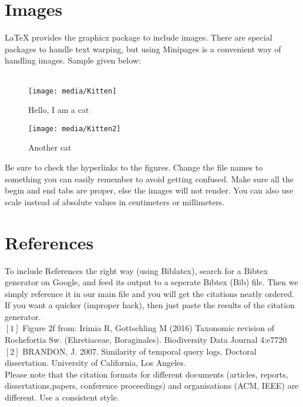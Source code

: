 \documentclass[ 12pt,a4paper,twocolumn,fleqn]{article}
\begin{document}
\section{Images}
\LaTeX{} provides the graphicx package to include images. There are special packages to handle text warping, but using Minipages is a convenient way of handling images. Sample given below: \\
\hfill
\\
\begin{figure}[H]
\begin{minipage}{0.5\textwidth}
\texttt{[image: media/Kitten]}
\centering
\caption{Hello, I am a cat}
\end{minipage}
\begin{minipage}
{.5\textwidth}
\texttt{[image: media/Kitten2]}
\centering
\caption{Another cat}
\end{minipage}
\end{figure}
Be sure to check the hyperlinks to the figures. Change the file names to something you can easily remember to avoid getting confused. Make sure all the begin and end tabs are proper, else the images will not render. You can also use scale instead of absolute values in centimeters or millimeters.
\section{References}

To include References the right way (using Biblatex), search for a Bibtex generator on Google, and feed its output to a seperate Bibtex (Bib) file. Then we simply reference it in our main file and you will get the citations neatly ordered. If you want a quicker (improper hack), then just paste the results of the citation generator. \\
$[1]$ Figure 2f from: Irimia R, Gottschling M (2016) Taxonomic revision of Rochefortia Sw. (Ehretiaceae, Boraginales). Biodiversity Data Journal 4:e7720 
\\
$[2]$ BRANDON, J. 2007. Similarity of temporal query logs. Doctoral dissertation. University of California, Los Angeles. \\

Please note that the citation formats for different documents (articles, reports, dissertations,papers, conference proceedings) and organisations (ACM, IEEE) are different. Use a consistent style.
\end{document}
